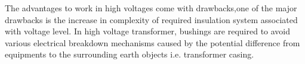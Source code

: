 The advantages to work in high voltages come with drawbacks,one of the major drawbacks is the increase in complexity of required insulation system associated with voltage level. In high voltage transformer, bushings are required to avoid various electrical breakdown mechanisms caused by the potential difference from equipments to the surrounding earth objects i.e. transformer casing. 